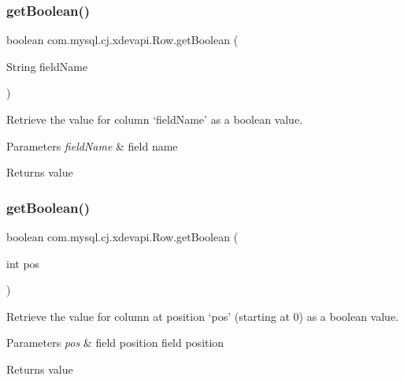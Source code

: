 \subsubsection{\texorpdfstring{get\+Boolean()}{getBoolean()}\hspace{0.1cm}{\footnotesize\ttfamily [1/2]}}
{\footnotesize\ttfamily boolean com.\+mysql.\+cj.\+xdevapi.\+Row.\+get\+Boolean (\begin{DoxyParamCaption}\item[{String}]{field\+Name }\end{DoxyParamCaption})}

Retrieve the value for column `field\+Name' as a boolean value.


\begin{DoxyParams}{Parameters}
{\em field\+Name} & field name \\
\hline
\end{DoxyParams}
\begin{DoxyReturn}{Returns}
value 
\end{DoxyReturn}
\mbox{\label{interfacecom_1_1mysql_1_1cj_1_1xdevapi_1_1_row_a6bdc2eced8a64d11edd870fbcf7f68d4}} 
\subsubsection{\texorpdfstring{get\+Boolean()}{getBoolean()}\hspace{0.1cm}{\footnotesize\ttfamily [2/2]}}
{\footnotesize\ttfamily boolean com.\+mysql.\+cj.\+xdevapi.\+Row.\+get\+Boolean (\begin{DoxyParamCaption}\item[{int}]{pos }\end{DoxyParamCaption})}

Retrieve the value for column at position `pos' (starting at 0) as a boolean value.


\begin{DoxyParams}{Parameters}
{\em pos} & field position field position \\
\hline
\end{DoxyParams}
\begin{DoxyReturn}{Returns}
value 
\end{DoxyReturn}
\mbox{\label{interfacecom_1_1mysql_1_1cj_1_1xdevapi_1_1_row_a33e5c8facc799a0c3e23370dab0ed23d}} 
